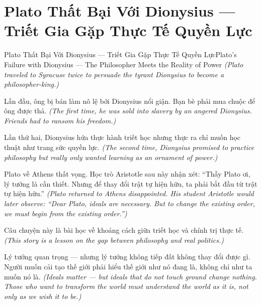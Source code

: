 \section{Plato Thất Bại Với Dionysius — Triết Gia Gặp Thực Tế Quyền Lực}
\begin{truyen}{Plato Thất Bại Với Dionysius — Triết Gia Gặp Thực Tế Quyền Lực}{Plato's Failure with Dionysius — The Philosopher Meets the Reality of Power}
\textit{(Plato traveled to Syracuse twice to persuade the tyrant Dionysius to become a philosopher-king.)}

Lần đầu, ông bị bán làm nô lệ bởi Dionysius nổi giận. Bạn bè phải mua chuộc để ông được thả.
\textit{(The first time, he was sold into slavery by an angered Dionysius. Friends had to ransom his freedom.)}

Lần thứ hai, Dionysius hứa thực hành triết học nhưng thực ra chỉ muốn học thuật như trang sức quyền lực.
\textit{(The second time, Dionysius promised to practice philosophy but really only wanted learning as an ornament of power.)}

Plato về Athens thất vọng. Học trò Aristotle sau này nhận xét: ``Thầy Plato ơi, lý tưởng là cần thiết. Nhưng để thay đổi trật tự hiện hữu, ta phải bắt đầu từ trật tự hiện hữu.''
\textit{(Plato returned to Athens disappointed. His student Aristotle would later observe: ``Dear Plato, ideals are necessary. But to change the existing order, we must begin from the existing order.'')}

Câu chuyện này là bài học về khoảng cách giữa triết học và chính trị thực tế.
\textit{(This story is a lesson on the gap between philosophy and real politics.)}

\end{truyen}

\begin{baihoc}
Lý tưởng quan trọng — nhưng lý tưởng không tiếp đất không thay đổi được gì. Người muốn cải tạo thế giới phải hiểu thế giới như nó đang là, không chỉ như ta muốn nó là.
\textit{(Ideals matter — but ideals that do not touch ground change nothing. Those who want to transform the world must understand the world as it is, not only as we wish it to be.)}
\end{baihoc}
\ngancach

